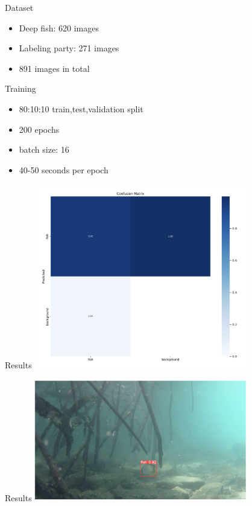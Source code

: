  \begin{frame}{Dataset}
    \begin{itemize}
        \item Deep fish: 620 images
         \item Labeling party: 271 images
         \item 891 images in total
    \end{itemize}    
    

 \end{frame}

 \begin{frame}{Training}
    \begin{itemize}
        \item 80:10:10 train,test,validation split
         \item 200 epochs 
         \item batch size: 16 
         \item 40-50 seconds per epoch 
    \end{itemize}    
    

 \end{frame}


 \begin{frame}{Results}
    \centering
        \includegraphics[height=0.7\textheight,width=0.7\textwidth,keepaspectratio]{images/1.png}
    

 \end{frame}

 \begin{frame}{Results}
    \centering
        \includegraphics[height=0.7\textheight,width=0.7\textwidth,keepaspectratio]{images/2.png}
    

 \end{frame}

